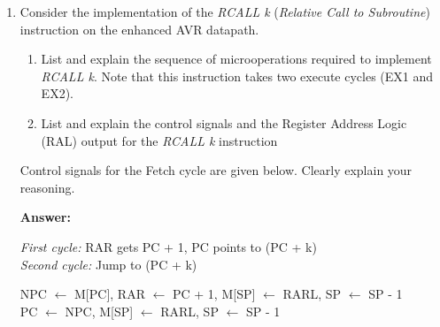 \documentclass[12pt,letterpaper]{article}
\begin{document}
\begin{enumerate}
		
		
		
		
		
		\clearpage
		\item
		Consider the implementation of the \textit{RCALL k} (\textit{Relative Call to Subroutine}) instruction on the enhanced AVR datapath.
		
		\begin{enumerate}[a]
			\item
			List and explain the sequence of microoperations required to implement \textit{RCALL k}. 
			Note that this instruction takes two execute cycles (EX1 and EX2).
			
			\item
			List and explain the control signals and the Register Address Logic (RAL) output for the \textit{RCALL k} instruction
		\end{enumerate}
		Control signals for the Fetch cycle are given below. Clearly explain your reasoning.
		
		\textbf{Answer:} 
		
		\textit{First cycle:} RAR gets PC + 1, PC points to (PC + k)
		\\
		\textit{Second cycle:} Jump to (PC + k)
		
		NPC $\leftarrow$ M[PC], RAR $\leftarrow$ PC + 1, M[SP] $\leftarrow$ RARL, SP $\leftarrow$ SP - 1
		\\
		PC $\leftarrow$ NPC, M[SP] $\leftarrow$ RARL, SP $\leftarrow$ SP - 1
		

\end{enumerate}
\end{document}
